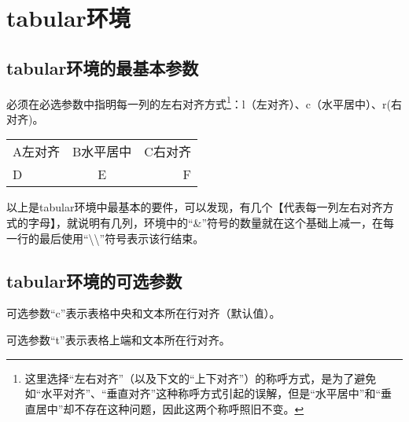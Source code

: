 ﻿\documentclass{article}
\begin{document}
\section{tabular环境}
\subsection{tabular环境的最基本参数}
    必须在必选参数中指明每一列的左右对齐方式\footnote{这里选择``左右对齐''（以及下文的``上下对齐''）的称呼方式，是为了避免如``水平对齐''、``垂直对齐''这种称呼方式引起的误解，但是``水平居中''和``垂直居中''却不存在这种问题，因此这两个称呼照旧不变。}：l（左对齐）、c（水平居中）、r(右对齐)。

    \mbox{}

    \begin{tabular}{lcr}
        A左对齐&B水平居中&C右对齐\\
        D&E&F\\
    \end{tabular}

    \mbox{}

    以上是tabular环境中最基本的要件，可以发现，有几个【代表每一列左右对齐方式的字母】，就说明有几列，环境中的``\&''符号的数量就在这个基础上减一，在每一行的最后使用``\textbackslash\textbackslash''符号表示该行结束。

\subsection{tabular环境的可选参数} 
    可选参数``c''表示表格中央和文本所在行对齐（默认值）。

    \mbox{}

    可选参数``t''表示表格上端和文本所在行对齐。

    \mbox{}
\end{document}
